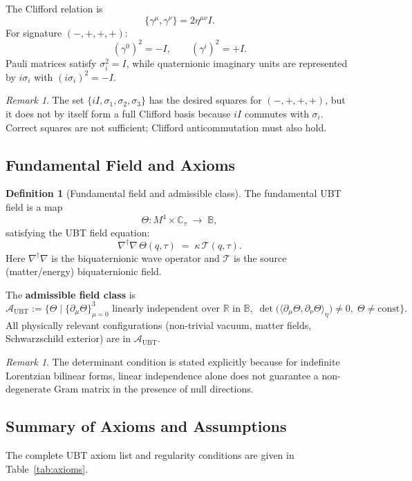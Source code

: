 \documentclass[12pt,a4paper]{article}
\theoremstyle{definition}
\newtheorem{definition}[theorem]{Definition}
\theoremstyle{remark}
\newtheorem{remark}[theorem]{Remark}
\newcommand{\BB}{\mathbb{B}}
\newcommand{\CC}{\mathbb{C}}
\newcommand{\RR}{\mathbb{R}}
\newcommand{\calA}{\mathcal{A}}
\newcommand{\calT}{\mathcal{T}}
\begin{document}
The Clifford relation is
\[
  \{\gamma^\mu,\gamma^\nu\}=2\eta^{\mu\nu}I.
\]
For signature $(-,+,+,+)$:
\[
  (\gamma^0)^2=-I,\qquad (\gamma^i)^2=+I.
\]
Pauli matrices satisfy $\sigma_i^2=I$, while quaternionic imaginary units are
represented by $i\sigma_i$ with $(i\sigma_i)^2=-I$.
\begin{remark}
The set $\{iI,\sigma_1,\sigma_2,\sigma_3\}$ has the desired squares for
$(-,+,+,+)$, but it does not by itself form a full Clifford basis because
$iI$ commutes with $\sigma_i$. Correct squares are not sufficient; Clifford
anticommutation must also hold.
\end{remark}

\subsection{Fundamental Field and Axioms}

\begin{definition}[Fundamental field and admissible class]
\label{def:theta}
The fundamental UBT field is a map
\[
  \Theta : M^4 \times \CC_\tau \;\longrightarrow\; \BB,
\]
satisfying the UBT field equation:
\[
  \nabla^\dagger\nabla\,\Theta(q,\tau) \;=\; \kappa\,\calT(q,\tau).
\]
Here $\nabla^\dagger\nabla$ is the biquaternionic wave operator and
$\calT$ is the source (matter/energy) biquaternionic field.

The \textbf{admissible field class} is
\[
  \calA_{\mathrm{UBT}} :=
  \bigl\{\Theta \;\big|\; \{\partial_\mu\Theta\}_{\mu=0}^3
  \text{ linearly independent over } \RR \text{ in } \BB,\;
  \det\!\big(\langle\partial_\mu\Theta,\partial_\nu\Theta\rangle_\eta\big)\neq 0,\;
  \Theta \neq \mathrm{const}\bigr\}.
\]
All physically relevant configurations (non-trivial vacuum, matter fields,
Schwarzschild exterior) are in $\calA_{\mathrm{UBT}}$.
\end{definition}

\begin{remark}
The determinant condition is stated explicitly because for indefinite Lorentzian
bilinear forms, linear independence alone does not guarantee a non-degenerate
Gram matrix in the presence of null directions.
\end{remark}

\subsection{Summary of Axioms and Assumptions}

The complete UBT axiom list and regularity conditions are given in
Table~\ref{tab:axioms}.
\end{document}
